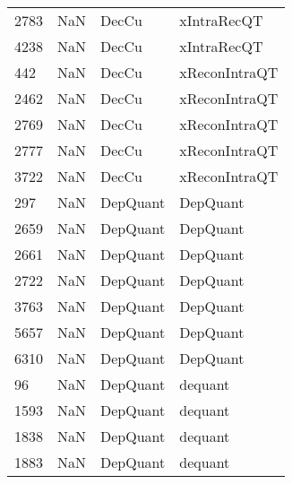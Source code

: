 \begin{tabular}{llll}
2783 &                   NaN &                      DecCu &                               xIntraRecQT \\
4238 &                   NaN &                      DecCu &                               xIntraRecQT \\
442  &                   NaN &                      DecCu &                             xReconIntraQT \\
2462 &                   NaN &                      DecCu &                             xReconIntraQT \\
2769 &                   NaN &                      DecCu &                             xReconIntraQT \\
2777 &                   NaN &                      DecCu &                             xReconIntraQT \\
3722 &                   NaN &                      DecCu &                             xReconIntraQT \\
297  &                   NaN &                   DepQuant &                                  DepQuant \\
2659 &                   NaN &                   DepQuant &                                  DepQuant \\
2661 &                   NaN &                   DepQuant &                                  DepQuant \\
2722 &                   NaN &                   DepQuant &                                  DepQuant \\
3763 &                   NaN &                   DepQuant &                                  DepQuant \\
5657 &                   NaN &                   DepQuant &                                  DepQuant \\
6310 &                   NaN &                   DepQuant &                                  DepQuant \\
96   &                   NaN &                   DepQuant &                                   dequant \\
1593 &                   NaN &                   DepQuant &                                   dequant \\
1838 &                   NaN &                   DepQuant &                                   dequant \\
1883 &                   NaN &                   DepQuant &                                   dequant \\

\end{tabular}

